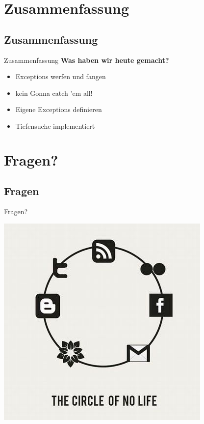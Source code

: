 \documentclass[18pt]{beamer}
\begin{document}
\section*{Zusammenfassung}
\subsection*{Zusammenfassung}
\begin{frame}{Zusammenfassung}
	\textbf{Was haben wir heute gemacht?}
	
	\begin{itemize}
		\item Exceptions werfen und fangen
		\item kein Gonna catch 'em all!
		\item Eigene Exceptions definieren
		\item Tiefensuche implementiert
	\end{itemize}
\end{frame}

\section{Fragen?}
\subsection*{Fragen} %
\begin{frame}	
	\begin{center}
		\huge{Fragen?}
	\end{center}
\end{frame}



\begin{frame}[full]
\includegraphics[scale=0.55]{bilder/comics/September-25-2011-18-44-59-aa71ce1bd67502c27bc56a6b8d724897.jpeg}
\end{frame}
\end{document}
